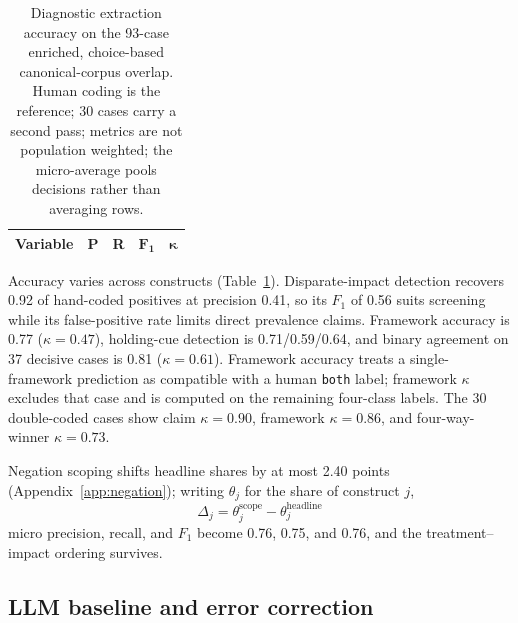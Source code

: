 \documentclass[11pt]{article}
\begin{document}
\begin{table}[t]
\centering\small
\begin{tabular}{lcccc}
\toprule
\textbf{Variable} & \textbf{P} & \textbf{R} & $\mathbf{F_1}$ & $\boldsymbol{\kappa}$ \\
\midrule

\end{tabular}
\caption{Diagnostic extraction accuracy on the 93-case enriched, choice-based canonical-corpus overlap. Human coding is the reference; 30 cases carry a second pass; metrics are not population weighted; the micro-average pools decisions rather than averaging rows.}
\label{tab:gold}
\end{table}

Accuracy varies across constructs (Table~\ref{tab:gold}). Disparate-impact detection recovers 0.92 of hand-coded positives at precision 0.41, so its $F_1$ of 0.56 suits screening while its false-positive rate limits direct prevalence claims. Framework accuracy is 0.77 ($\kappa=0.47$), holding-cue detection is 0.71/0.59/0.64, and binary agreement on 37 decisive cases is 0.81 ($\kappa=0.61$). Framework accuracy treats a single-framework prediction as compatible with a human \texttt{both} label; framework $\kappa$ excludes that case and is computed on the remaining four-class labels. The 30 double-coded cases show claim $\kappa=0.90$, framework $\kappa=0.86$, and four-way-winner $\kappa=0.73$.

Negation scoping shifts headline shares by at most 2.40 points (Appendix~\ref{app:negation}); writing $\theta_j$ for the share of construct $j$,
\begin{equation}\label{eq:negation}
\Delta_j = \theta_j^{\text{scope}} - \theta_j^{\text{headline}}
\end{equation}
micro precision, recall, and $F_1$ become 0.76, 0.75, and 0.76, and the treatment--impact ordering survives.

\subsection{LLM baseline and error correction}\label{sec:llm}
\end{document}
